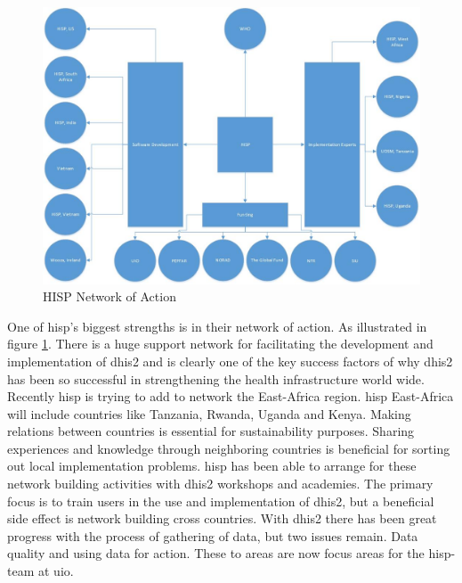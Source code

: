 \begin{figure}
\centering
\includegraphics[width=\columnwidth]{context/img/networkOfAction}
\caption{HISP Network of Action}
\label{fig:hispnet}
\end{figure}

One of \gls{hisp}'s biggest strengths is in their network of action. As illustrated in figure \ref{fig:hispnet}. There is a huge support network for facilitating the development and implementation of \gls{dhis2} and is clearly one of the key success factors of why \gls{dhis2} has been so successful in strengthening the health infrastructure world wide. Recently \gls{hisp} is trying to add to network the East-Africa region. \gls{hisp} East-Africa will include countries like Tanzania, Rwanda, Uganda and Kenya. Making relations between countries is essential for sustainability purposes. Sharing experiences and knowledge through neighboring countries is beneficial for sorting out local implementation problems. \gls{hisp} has been able to arrange for these network building activities with \gls{dhis2} workshops and academies. The primary focus is to train users in the use and implementation of \gls{dhis2}, but a beneficial side effect is network building cross countries. 
With \gls{dhis2} there has been great progress with the process of gathering of data, but two issues remain. Data quality and using data for action. These to areas are now focus areas for the \gls{hisp}-team at \gls{uio}.

\cite{strategyhisp:uio}
\cite{networkhisp:uio}
\cite{jbemss:noa}

